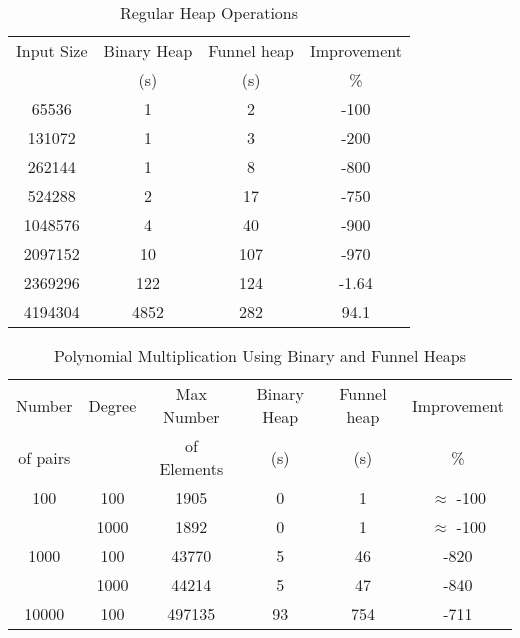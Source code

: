 \documentclass[11pt]{amsart}
\begin{document}

\begin{table}[htbp]
   \centering
      \caption{Regular Heap Operations}
   \begin{tabular}{|c|c|c|c|}
   	\hline
		Input Size & Binary Heap & Funnel heap 	& Improvement \\ 
				&	(s)		&	(s)		& 		 \%		\\ \hline
		65536	&	 1		&	2		&	-100			\\ \hline
		131072	&	1		&	3		&	-200		\\ \hline
		262144	&	1		&	8		&	-800		\\ \hline
		524288	&	2		&	17		&	-750		\\ \hline
		1048576	&	 4		&	40		&	-900			\\ \hline
		2097152 	&	10		&	107		&	-970		\\ \hline
\rowcolor{red!50}		
		2369296	&	122		&	124		&	-1.64		\\ \hline
		4194304	&    4852		&	282		&	94.1			\\ \hline
   \end{tabular}
   \label{tab:booktabs}
\end{table}


\begin{table}[htbp]
   \centering
      \caption{Polynomial Multiplication Using Binary and Funnel Heaps}
   \begin{tabular}{|c|c|c|c|c|c|}
   	\hline
		 Number   & 	Degree	& Max Number & Binary Heap & Funnel heap 	& Improvement \\ 
		 of pairs 	&			& of Elements	& 	(s)		&	(s)		& 		\%		 		\\ \hline
		100		&	 100		&	1905		&	0		&	1		&	$\approx$ -100			\\ \cline{2-6}
				&	 1000	&	1892		&	0		&	1		&	$\approx$ -100			\\ \hline
		1000		&	 100		&	43770	&	5		&	46		&	-820				\\ \cline{2-6}
				&	 1000	&	44214	&	5		&	47		&	-840				\\ \hline
		10000	&	 100		&	497135	&	93		&	754		&	-711				\\ \hline
   \end{tabular}
   \label{tab:booktabs}
\end{table}
\end{document}
